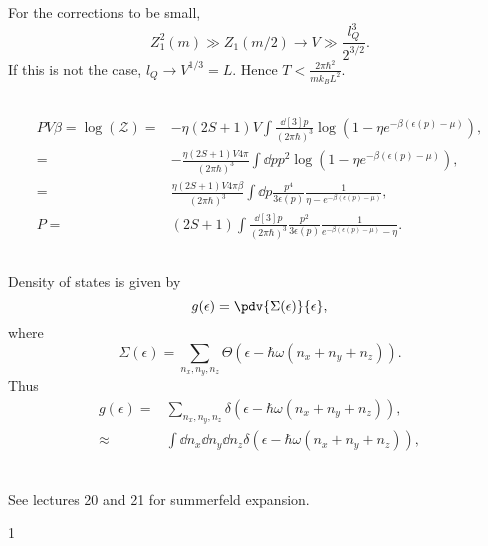 \documentclass[a4paper,12pt,twoside]{article}
\newcommand{\mcols}{0}
\begin{document}
\begin{multicols*}{2}
\subsubsection{}
For the corrections to be small,
\begin{equation}
	Z_1^2(m) \gg Z_1(m/2) \rightarrow V \gg \frac{l_Q^3}{2^{3/2}}.
\end{equation}
If this is not the case, $l_Q \rightarrow V^{1/3} = L$.
Hence $T < \frac{2\pi \hbar^2}{m k_B L^2}$.

\subsection{}
\begin{align}
	PV\beta = \log(\mathcal{Z}) =& -\eta(2S+1)V\int\frac{\dd[3]{p}}{(2\pi\hbar)^3}\log(1-\eta e^{-\beta(\epsilon(p) - \mu)}),\\
	=& -\frac{\eta(2S+1)V 4\pi}{(2\pi\hbar)^3} \int \dd{p} p^2 \log(1-\eta e^{-\beta(\epsilon(p)-\mu)}),\\
	=& \frac{\eta (2S+1)V 4\pi \beta}{(2\pi\hbar)^3} \int \dd{p}\frac{p^4}{3\epsilon(p)} \frac{1}{\eta - e^{-\beta(\epsilon(p)-\mu)}},\\
	P =& (2S+1) \int \frac{\dd[3]{p}}{(2\pi\hbar)^3}\frac{p^2}{3\epsilon(p)} \frac{1}{e^{-\beta(\epsilon(p)-\mu)}-\eta}.
\end{align}
\subsection{}
Density of states is given by
\begin{equation}
	g(\epsilon) = \pdv{\Sigma(\epsilon)}{\epsilon},
\end{equation}
where
\begin{equation}
	\Sigma(\epsilon) = \sum_{n_x,n_y,n_z} \Theta(\epsilon - \hbar\omega(n_x+n_y+n_z)).
\end{equation}
Thus
\begin{align}
	g(\epsilon) =& \sum_{n_x,n_y,n_z} \delta(\epsilon - \hbar\omega(n_x+n_y+n_z)),\\
	\approx& \int \dd{n_x}\dd{n_y}\dd{n_z} \delta(\epsilon - \hbar\omega(n_x+n_y+n_z)),\\
\end{align}
\subsection{}
See lectures 20 and 21 for summerfeld expansion.

\printBib


\if\mcols1
\end{multicols*}
\fi
\end{document}
